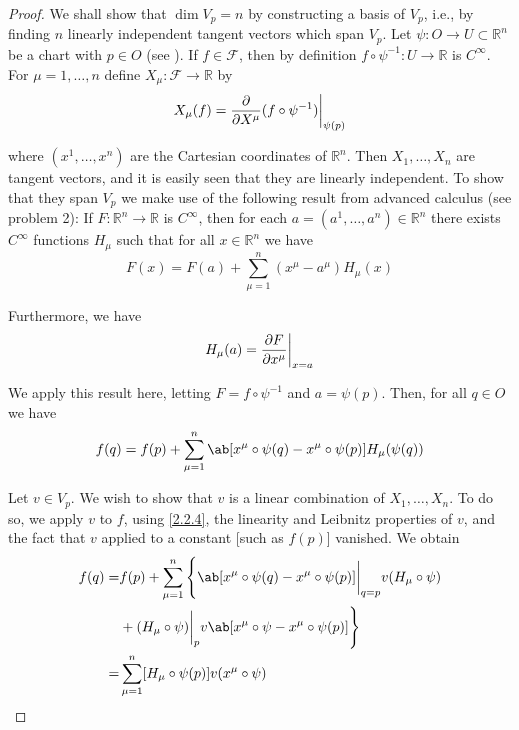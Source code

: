 \begin{proof}
    We shall show that $\dim V_p=n$ by constructing a basis of $V_p$, i.e., by finding $n$ linearly independent tangent vectors which span $V_p$. Let $\psi:O\to U\subset\mathbb{R}^n$ be a chart with $p\in O$ (see ). If $f\in\mathscr{F}$, then by definition $f\circ\psi^{-1}:U\to\mathbb{R}$ is $C^\infty$. For $\mu=1,\ldots,n$ define $X_\mu:\mathscr{F}\to\mathbb{R}$ by
\begin{equation}
    X_\mu(f)=\pdv{}{X^\mu}(f\circ\psi^{-1})\bigg|_{\psi(p)}
\end{equation}

where $(x^1,\ldots,x^n)$ are the Cartesian coordinates of $\mathbb{R}^n$. Then $X_1,\ldots,X_n$ are tangent vectors, and it is easily seen that they are linearly independent. To show that they span $V_p$ we make use of the following result from advanced calculus (see problem 2): If $F:\mathbb{R}^n\to\mathbb{R}$ is $C^\infty$, then for each $a=(a^1,\ldots,a^n)\in\mathbb{R}^n$ there exists $C^\infty$ functions $H_\mu$ such that for all $x\in\mathbb{R}^n$ we have
\begin{equation}
    F(x)=F(a)+\sum_{\mu=1}^n(x^\mu-a^\mu)H_\mu(x)
    \label{2.2.2}
\end{equation}

Furthermore, we have
\begin{equation}
    H_\mu(a)=\pdv{F}{x^\mu}\bigg|_{x=a}
    \label{2.2.3}
\end{equation}

We apply this result here, letting $F=f\circ\psi^{-1}$ and $a=\psi(p)$. Then, for all $q\in O$ we have
\begin{equation}
    f(q)=f(p)+\sum_{\mu=1}^n\ab[x^\mu\circ\psi(q)-x^\mu\circ\psi(p)]H_\mu(\psi(q))
    \label{2.2.4}
\end{equation}

Let $v\in V_p$. We wish to show that $v$ is a linear combination of $X_1,\ldots,X_n$. To do so, we apply $v$ to $f$, using \eqref{2.2.4}, the linearity and Leibnitz properties of $v$, and the fact that $v$ applied to a constant [such as $f(p)$] vanished. We obtain
\begin{equation}
\begin{aligned}
    f(q)= & f(p)+\sum_{\mu=1}^n\Bigg\{\ab[x^\mu\circ\psi(q)-x^\mu\circ\psi(p)]\bigg|_{q=p}v(H_\mu\circ\psi)\\
    & +(H_\mu\circ\psi)\bigg|_pv\ab[x^\mu\circ\psi-x^\mu\circ\psi(p)]\Bigg\}\\
    = & \sum_{\mu=1}^n[H_\mu\circ\psi(p)]v(x^\mu\circ\psi)
\end{aligned}
\label{2.2.5}
\end{equation}


\end{proof}
